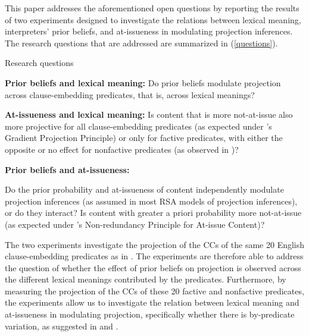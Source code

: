 \documentclass[11pt,fleqn]{article}
\newcommand{\6}{\mbox{$[\hspace*{-.6mm}[$}}
\newcommand{\9}{\mbox{$]\hspace*{-.6mm}]$}}
\newcommand{\citepos}[1]{\citeauthor{#1}'s \citeyear{#1}}
\begin{document}
\medskip

This paper addresses the aforementioned open questions by reporting the results of two experiments designed to investigate the relations between lexical meaning, interpreters' prior beliefs, and at-issueness in modulating projection inferences. The research questions that are addressed are summarized in (\ref{questions}). 

\begin{exe}
\ex\label{questions} Research questions
\begin{xlist}
 {\bf Prior beliefs and lexical meaning:} Do prior beliefs modulate projection across clause-embedding predicates, that is, across lexical meanings? 

 {\bf At-issueness and lexical meaning:} Is content that is more not-at-issue also more projective for all clause-embedding predicates (as expected under \citepos{tbd-variability} Gradient Projection Principle) or only for factive predicates, with either the opposite or no effect for nonfactive predicates (as observed in \citealt{djaerv-bacovcin-salt27,djaerv-bacovcin2020,mahler-etal2020})?

 {\bf Prior beliefs and at-issueness:} 
\begin{xlist}
 Do the prior probability and at-issueness of content independently modulate projection inferences  (as assumed in most RSA models of projection inferences), or do they interact? 
 Is content with greater a priori probability more not-at-issue (as expected under \citepos{tonhauser-etal-eval} Non-redundancy Principle for At-issue Content)? 
\end{xlist}
\end{xlist}
\end{exe}

The two experiments investigate the projection of the CCs of the same 20 English clause-embedding predicates as in \citealt{degen-tonhauser-openmind,degen-tonhauser-language}. The experiments are therefore able to address the question of whether the effect of prior beliefs on projection is observed across the different lexical meanings contributed by the predicates. Furthermore, by measuring the projection of the CCs of these 20  factive and nonfactive predicates, the experiments allow us to investigate the relation between lexical meaning and at-issueness in modulating projection, specifically whether there is by-predicate variation, as suggested in \citealt{djaerv-bacovcin-salt27,djaerv-bacovcin2020} and \citealt{mahler-etal2020}. 
\end{document}
